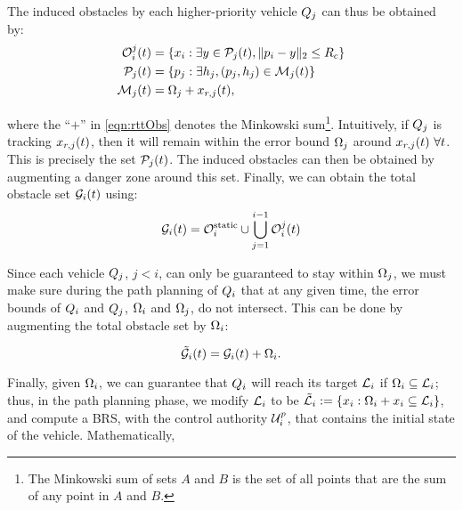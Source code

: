 The induced obstacles by each higher-priority vehicle $Q_j$ can thus be obtained by: 
\begin{equation} 
\label{eqn:rttObs}
\begin{aligned}
\mathcal{O}_i^j(t) &=  \{x_i: \exists y \in \mathcal{P}_j(t), \|p_i - y\|_2 \le R_c \} \\
\mathcal{P}_j(t) &= \{p_j: \exists h_j, (p_j, h_j) \in \mathcal{M}_j(t)\} \\
\mathcal{M}_j(t) &= \Omega_j  + x_{r,j}(t),
\end{aligned}
\end{equation}

\noindent where the ``$+$'' in \eqref{eqn:rttObs} denotes the Minkowski sum\footnote{The Minkowski sum of sets $A$ and $B$ is the set of all points that are the sum of any point in $A$ and $B$.}. Intuitively, if $Q_j$ is tracking $x_{r,j}(t)$, then it will remain within the error bound $\Omega_j$ around $x_{r,j}(t) ~\forall t$. This is precisely the set $\mathcal{P}_j(t)$. The induced obstacles can then be obtained by augmenting a danger zone around this set. Finally, we can obtain the total obstacle set $\mathcal{G}_i(t)$ using:
\begin{equation}
\label{eq:obsseti}
\mathcal{G}_i(t)  = \mathcal{O}^\text{static}_i \cup \bigcup_{j=1}^{i-1} \mathcal{O}_i^j(t)
\end{equation} 

Since each vehicle $Q_j$, $j<i$, can only be guaranteed to stay within $\Omega_j$, we must make sure during the path planning of $Q_i$ that at any given time, the error bounds of $Q_i$ and $Q_j$, $\Omega_i$ and $\Omega_j$, do not intersect. This can be done by augmenting the total obstacle set by $\Omega_i$:%

\begin{equation} 
\label{eqn:rttAugObs}
\tilde{\mathcal{G}}_i(t) = \mathcal{G}_i(t) + \Omega_i.
\end{equation}

Finally, given $\Omega_i$, we can guarantee that $Q_i$ will reach its target $\mathcal{L}_i$ if $\Omega_i \subseteq \mathcal{L}_i$; thus, in the path planning phase, we modify $\mathcal{L}_i$ to be $\tilde{\mathcal{L}}_i := \{x_i: \Omega_i + x_i \subseteq \mathcal{L}_i\}$, and compute a BRS, with the control authority $\mathcal{U}^p_i$, that contains the initial state of the vehicle. Mathematically,

